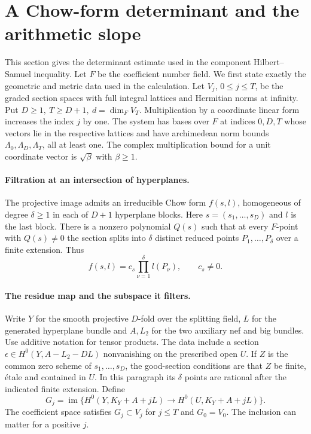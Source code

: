 \section{A Chow-form determinant and the arithmetic slope}
\label{sec:chow-determinant}
This section gives the determinant estimate used in the component
Hilbert--Samuel inequality. Let \(F\) be the coefficient number field.
We first state exactly the geometric and metric data used in the
calculation. Let \(V_j\), \(0\le j\le T\), be the graded section spaces
with full integral lattices and Hermitian norms at infinity. Put
\(D\ge1,\ T\ge D+1,\ d=\dim_F V_T\). Multiplication by a coordinate
linear form increases the index \(j\) by one. The system has
bases over \(F\) at indices \(0,D,T\) whose vectors lie in the respective lattices and have archimedean norm bounds
\(\Lambda_0,\Lambda_D,\Lambda_T\), all at least one. The complex
multiplication bound for a unit coordinate vector is \(\sqrt\beta\)
with \(\beta\ge1\).

\paragraph{Filtration at an intersection of hyperplanes.}
The projective image admits an irreducible Chow form \(f(s,l)\),
homogeneous of degree \(\delta\ge1\) in each of \(D+1\) hyperplane
blocks. Here \(s=(s_1,\ldots,s_D)\) and \(l\) is the last block.
There is a nonzero polynomial \(Q(s)\) such that at every \(F\)-point
with \(Q(s)\ne0\) the section splits into \(\delta\) distinct reduced
points \(P_1,\ldots,P_\delta\) over a finite extension. Thus
\[
 f(s,l)=c_s\prod_{\nu=1}^\delta l(P_\nu),\qquad c_s\ne0.
\]
\paragraph{The residue map and the subspace it filters.}
Write \(Y\) for the smooth projective \(D\)-fold over the splitting
field, \(L\) for the generated hyperplane bundle and \(A,L_2\) for
the two auxiliary nef and big bundles. Use additive notation for
tensor products. The data include a section
\(\epsilon\in H^0(Y,A-L_2-DL)\) nonvanishing on the prescribed
open \(U\). If \(Z\) is the common zero scheme of \(s_1,\ldots,s_D\),
the good-section conditions are that \(Z\) be finite, \'etale and
contained in \(U\). In this paragraph its \(\delta\) points are
rational after the indicated finite extension. Define
\[
 G_j=\operatorname{im}\{H^0(Y,K_Y+A+jL)\to H^0(U,K_Y+A+jL)\}.
\]
The coefficient space satisfies \(G_j\subset V_j\) for \(j\le T\)
and \(G_0=V_0\). The inclusion can matter for a positive \(j\).

